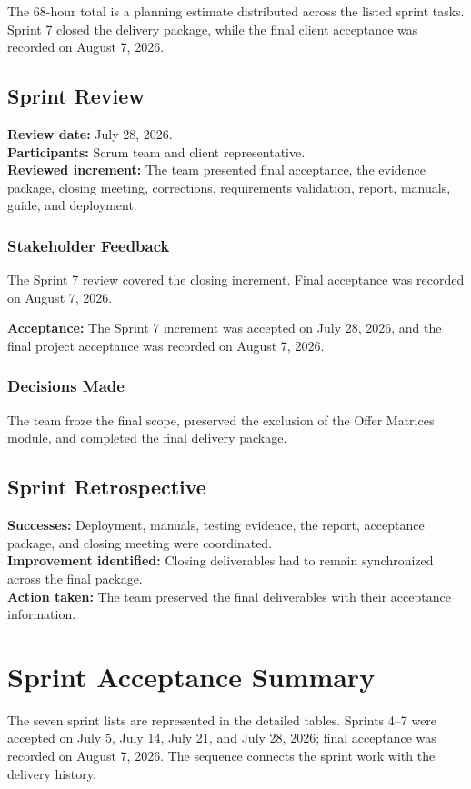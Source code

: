 \documentclass[letterpaper%
, oneside%
, 12pt%
, memoireprojet%
, english%
,creativecommons,hyperref, withAlgo2e %
]{thETS}
\begin{document}
The 68-hour total is a planning estimate distributed across the listed sprint tasks. Sprint 7
closed the delivery package, while the final client acceptance was recorded on August 7, 2026.

\subsection{Sprint Review}
\textbf{Review date:} July 28, 2026.\\
\textbf{Participants:} Scrum team and client representative.\\
\textbf{Reviewed increment:} The team presented final acceptance, the evidence package, closing
meeting, corrections, requirements validation, report, manuals, guide, and deployment.

\subsubsection{Stakeholder Feedback}
The Sprint 7 review covered the closing increment. Final acceptance was recorded on August 7, 2026.

\textbf{Acceptance:} The Sprint 7 increment was accepted on July 28, 2026, and the final project
acceptance was recorded on August 7, 2026.

\subsubsection{Decisions Made}
The team froze the final scope, preserved the exclusion of the Offer Matrices module, and completed
the final delivery package.

\subsection{Sprint Retrospective}
\textbf{Successes:} Deployment, manuals, testing evidence, the report, acceptance package, and closing meeting were coordinated.\\
\textbf{Improvement identified:} Closing deliverables had to remain synchronized across the final package.\\
\textbf{Action taken:} The team preserved the final deliverables with their acceptance information.

\section{Sprint Acceptance Summary}
The seven sprint lists are represented in the detailed tables. Sprints 4--7 were accepted on July
5, July 14, July 21, and July 28, 2026; final acceptance was recorded on August 7, 2026. The
sequence connects the sprint work with the delivery history.
\end{document}
